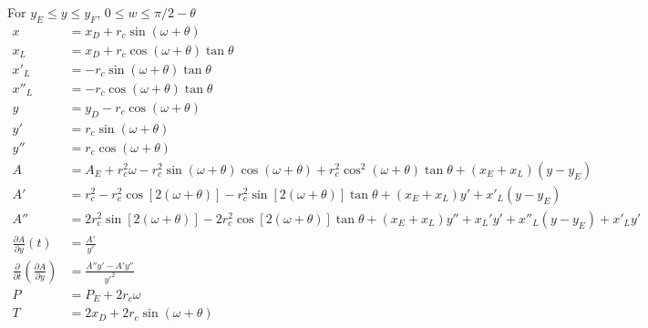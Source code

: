 For $y_E \le y \le y_F$, $0 \le w \le \pi/2 - \theta $
\begin{equation}
\begin{aligned}
x &= x_D +  r_c \sin(\omega +\theta) \\
x_L &= x_D +  r_c \cos(\omega +\theta) \tan\theta \\
x'_L &= -  r_c \sin(\omega +\theta) \tan\theta \\
x''_L &=-  r_c \cos(\omega +\theta) \tan\theta \\
y &= y_D - r_c \cos(\omega +\theta) \\
y' &=  r_c \sin(\omega +\theta) \\
y'' &=  r_c \cos(\omega +\theta) \\
A &= A_E +  r_c^2 \omega - r_c^2 \sin(\omega + \theta) \cos(\omega + \theta) + r_c^2 \cos^2(\omega + \theta) \tan\theta  + (x_E +x_L) (y - y_E)  \\
A' &=  r_c^2 - r_c^2 \cos \left[2(\omega + \theta)\right] - r_c^2 \sin [2(\omega + \theta)] \tan\theta  + (x_E +x_L)  y' +  x'_L (y - y_E) \\
A'' &=  2 r_c^2 \sin \left[2(\omega + \theta)\right] - 2 r_c^2 \cos [2(\omega + \theta)] \tan\theta  + (x_E +x_L)  y'' + x_L'y' +  x''_L (y - y_E) + x'_Ly'\\
\frac{\partial A}{\partial y}(t) &= \frac{A'}{y'} \\
\frac{\partial}{\partial t}\left( \frac{\partial A}{\partial y}\right) &= \frac{A''y' - A'y''}{y'^2} \\
P &= P_E + 2 r_c \omega \\
T &= 2 x_D + 2 r_c \sin(\omega + \theta) \\
\end{aligned}
\end{equation}






